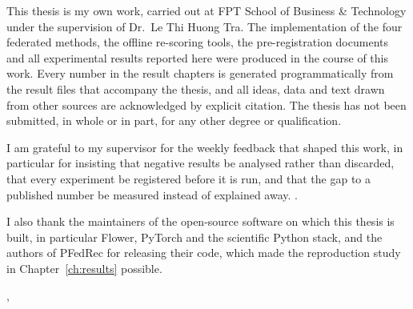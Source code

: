 \thispagestyle{plain}

This thesis is my own work, carried out at FPT School of Business \& Technology under the
supervision of Dr.\ Le Thi Huong Tra. The implementation of the four federated methods, the
offline re-scoring tools, the pre-registration documents and all experimental results reported
here were produced in the course of this work. Every number in the result chapters is generated
programmatically from the result files that accompany the thesis, and all ideas, data and text
drawn from other sources are acknowledged by explicit citation. The thesis has not been submitted,
in whole or in part, for any other degree or qualification.

I am grateful to my supervisor for the weekly feedback that shaped this work, in particular for
insisting that negative results be analysed rather than discarded, that every experiment be
registered before it is run, and that the gap to a published number be measured instead of
explained away. .

I also thank the maintainers of the open-source software on which this thesis is built, in
particular Flower, PyTorch and the scientific Python stack, and the authors of PFedRec for releasing
their code, which made the reproduction study in Chapter~\ref{ch:results} possible.

\vspace{1.5cm}
\noindent \thethesiscity, \thethesismonth\ \thethesisyear \hfill \thethesisauthor
